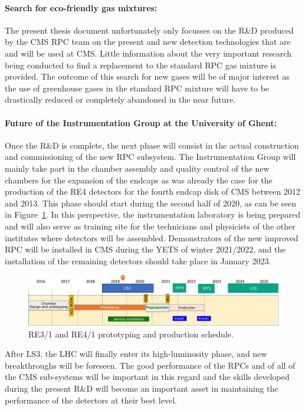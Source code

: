 	\paragraph*{Search for eco-friendly gas mixtures:} The present thesis document unfortunately only focusses on the R\&D produced by the CMS RPC team on the present and new detection technologies that are and will be used at CMS. Little information about the very important research being conducted to find a replacement to the standard RPC gas mixture is provided. The outcome of this search for new gases will be of major interest as the use of greenhouse gases in the standard RPC mixture will have to be drastically reduced or completely abandoned in the near future.
	
	\paragraph*{Future of the Instrumentation Group at the University of Ghent:} Once the R\&D is complete, the next phase will consist in the actual construction and commissioning of the new RPC subsystem. The Instrumentation Group will mainly take part in the chamber assembly and quality control of the new chambers for the expansion of the endcaps as was already the case for the production of the RE4 detectors for the fourth endcap disk of CMS between 2012 and 2013. This phase should start during the second half of 2020, as can be seen in Figure~\ref{fig:milestones}. In this perspective, the instrumentation laboratory is being prepared and will also serve as training site for the technicians and physicists of the other institutes where detectors will be assembled. Demonstrators of the new improved RPC will be installed in CMS during the \acl{YETS} of winter 2021/2022, and the installation of the remaining detectors should take place in January 2023.
	
	\begin{figure}[H]
	    \centering
	    \includegraphics[width=\linewidth]{fig/chapt7/CMS-RPC-Milestones.pdf}
	    \caption{\label{fig:milestones} RE3/1 and RE4/1 prototyping and production schedule.}
	\end{figure}
	
	After LS3, the LHC will finally enter its high-luminosity phase, and new breakthroughs will be foreseen. The good performance of the RPCs and of all of the CMS sub-systems will be important in this regard and the skills developed during the present R\&D will become an important asset in maintaining the performance of the detectors at their best level.

\clearpage{\pagestyle{empty}\cleardoublepage}